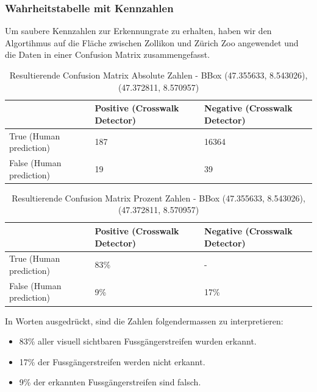 \subsubsection{Wahrheitstabelle mit Kennzahlen}
Um saubere Kennzahlen zur Erkennungrate zu erhalten, haben wir den Algortihmus auf die Fläche zwischen Zollikon und Zürich Zoo angewendet und die Daten in einer Confusion Matrix zusammengefasst.
\\
\begin{table}[H]
	\centering
    \begin{tabular}{|l|l|l|}
    \hline    
        \rowcolor{lightblue} 
        & Positive (Crosswalk Detector) & Negative (Crosswalk Detector)  \\ \hline
     \cellcolor{lightblue}True (Human prediction) & 187 & 16364 \\ \hline
     \cellcolor{lightblue}False (Human prediction) & 19 & 39 \\ \hline
    \end{tabular}    
    \caption[Resultierende Confusion Matrix Absolute Zahlen]{Resultierende Confusion Matrix Absolute Zahlen - BBox (47.355633, 8.543026), (47.372811, 8.570957)}
\end{table}
\medskip
\begin{table}[H]
	\centering
    \begin{tabular}{|l|l|l|}
    \hline   
    \rowcolor{lightblue} 
     & Positive (Crosswalk Detector) & Negative (Crosswalk Detector)  \\ \hline
     \cellcolor{lightblue}True (Human prediction) & 83\% & - \\ \hline
     \cellcolor{lightblue}False (Human prediction) & 9\% & 17\% \\ \hline
    \end{tabular}    
    \caption[Resultierende Confusion Matrix Prozent Zahlen]{Resultierende Confusion Matrix Prozent Zahlen - BBox (47.355633, 8.543026), (47.372811, 8.570957)}
\end{table}

In Worten ausgedrückt, sind die Zahlen folgendermassen zu interpretieren:
\begin{itemize}
	\item 83\% aller visuell sichtbaren Fussgängerstreifen wurden erkannt.
	\item 17\% der Fussgängerstreifen werden nicht erkannt.
	\item 9\% der erkannten Fussgängerstreifen sind falsch.
\end{itemize}

